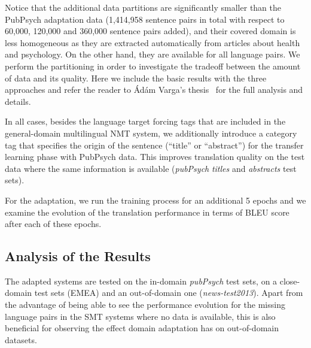 \documentclass[a4paper,11pt]{article}
\begin{document}
Notice that the additional data partitions are significantly smaller than the PubPsych adaptation data (1,414,958 sentence pairs in total with respect to 60,000, 120,000 and 360,000 sentence pairs added), and their covered domain is less homogeneous as they are extracted automatically from articles about health and psychology. On the other hand, they are available for all language pairs. We perform the partitioning in order to investigate the tradeoff between the amount of data and its quality.
Here we include the basic results with the three approaches and refer the reader to \'Ad\'am Varga's thesis~\cite{tesisAdam} for the full analysis and details.

In all cases, besides the language target forcing tags that are included in the general-domain multilingual NMT system, we additionally introduce a category tag that specifies the origin of the sentence (``title'' or ``abstract'') for the transfer learning phase with PubPsych data. This improves translation quality on the test data where the same information is available (\textit{pubPsych} \textit{titles} and \textit{abstracts} test sets).

For the adaptation, we run the training process for an additional 5 epochs and we examine the evolution of the translation performance in terms of BLEU score after each of these epochs. 

\subsection{Analysis of the Results}
\label{ss:nmtResults}


The adapted systems are tested on the in-domain \textit{pubPsych} test sets, on a close-domain test sets (EMEA) and an out-of-domain one (\textit{news-test2013}). Apart from the advantage of being able to see the performance evolution for the missing language pairs in the SMT systems where no data is available, this is also beneficial for observing the effect domain adaptation has on out-of-domain datasets.
\end{document}
